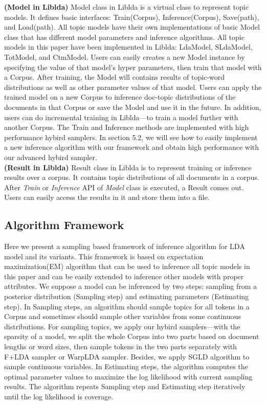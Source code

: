 \documentclass[10pt,journal,cspaper,compsoc]{IEEEtran}
\begin{document}
    \vspace{0.5em}
    \noindent
    {\bf (Model in Liblda)} Model class in Liblda is a virtual  class to represent topic models. 
    It defines basic interfaces: Train(Corpus), Inference(Corpus), Save(path), and Load(path). 
    All topic models have their own implementations of basic Model class that has different model parameters and inference algorithms. 
    All topic models in this paper have been implemented in Liblda: LdaModel, SLdaModel, TotModel, and CtmModel. 
    Users can easily creates a new Model instance by specifying the
    value of that model's hyper parameters, then train that model with a Corpus. 
    After training, the Model will contains results of topic-word distributions as well as other parameter values of that model. 
    Users can apply the trained model on a new Corpus to inference doc-topic distributions of the documents in that Corpus or save the Model and use it in the future. 
    In addition, users can do incremental training in Liblda---to train a model further with another Corpus. 
    The Train and Inference methods are implemented with high performance
    hybird samplers. In section 5.2, we will see how to easily implement a new  inference algorithm with our framework and obtain high performance
    with our advanced hybird sampler.\\
    
    \vspace{0.5em}
    \noindent
    {\bf (Result in Liblda)} Result class in Liblda is to
    represent training or inference results over a corpus.
    It contains topic distributions of all documents in
    a corpus. After {\em Train} or {\em Inference} API 
    of {\em Model} class is executed, a Result comes out.
    Users can easily access the results in it and store them into
    a file.
    
    \subsection{Algorithm Framework}
    Here we present a sampling based framework of inference algorithm for LDA model and its variants. This framework is based on expectation maximization(EM) algorithm that can be used to inference all topic models in this paper and can be easily extended to inference other models with proper attributes. We suppose a model can be inferenced by two steps: sampling from a posterior distribution (Sampling step) and estimating parameters (Estimating step). In Sampling steps, an algorithm should sample topics for all tokens in
    a Corpus and sometimes should sample other variables from
    some continuous distributions. For sampling topics, we
    apply our hybird samplers---with the sparsity of a model,
    we split the whole Corpus into two parts based on document
    lengths or word sizes, then sample tokens in the two parts separately with F+LDA sampler or WarpLDA sampler. 
    Besides, we apply SGLD algorithm to sample continuous variables. 
    In Estimating steps, the algorithm computes the optimal parameter values to maximize the log likelihood with current sampling results. 
    The algorithm repeats Sampling step and Estimating step iteratively until the log likelihood is coverage.
    
\end{document}
